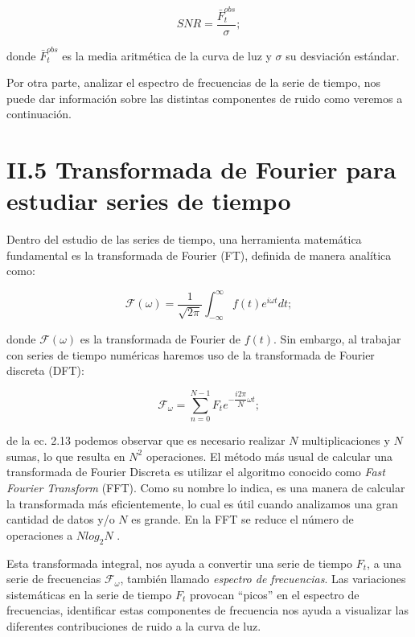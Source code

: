 \begin{equation}
  \displaystyle SNR=\dfrac{\bar{F}^{obs}_{t}}{\sigma};
\end{equation}

\noindent donde $\bar{F}^{obs}_{t}$ es la media aritmética de la curva de luz y $\sigma$ su desviación estándar.

Por otra parte, analizar el espectro de frecuencias de la serie de tiempo, nos puede dar información sobre las distintas componentes de ruido como veremos a continuación.

\section*{II.5 Transformada de Fourier para estudiar series de tiempo}

Dentro del estudio de las series de tiempo, una herramienta matemática fundamental es la transformada de Fourier (FT), definida de manera analítica como:

\begin{equation}
  \displaystyle \mathcal{F}(\omega )=\frac{1}{\sqrt{2\pi}}\int_{-\infty}^{\infty} f(t)e^{i\omega t}dt;
\end{equation}

\noindent donde $\mathcal{F}(\omega )$ es la transformada de Fourier de $f(t)$. Sin embargo, al trabajar con series de tiempo numéricas haremos uso de la transformada de Fourier discreta (DFT):  

\begin{equation}
  \displaystyle \mathcal{F}_{\omega}= \sum_{n=0}^{N-1} F_{t}e^{-\dfrac{i2\pi}{N}\omega t};
\end{equation}

\noindent de la ec. 2.13 podemos observar que es necesario realizar $N$ multiplicaciones y $N$ sumas, lo que resulta en $N^{2}$ operaciones. El método más usual de calcular una transformada de Fourier Discreta es utilizar el algoritmo conocido como \textit{Fast Fourier Transform} (FFT). Como su nombre lo indica, es una manera de calcular la transformada más eficientemente, lo cual es útil cuando analizamos una gran cantidad de datos y/o $N$ es grande. En la FFT se reduce el número de operaciones a $Nlog_{2}N$ \cite{cooley1965algorithm}. 

Esta transformada integral, nos ayuda a convertir una serie de tiempo $F_{t}$, a una serie de frecuencias $\mathcal{F}_{\omega}$, también llamado \textit{espectro de frecuencias}. Las variaciones sistemáticas en la serie de tiempo $F_{t}$ provocan ``picos'' en el espectro de frecuencias, identificar estas componentes de frecuencia nos ayuda a visualizar las diferentes contribuciones de ruido a la curva de luz.

